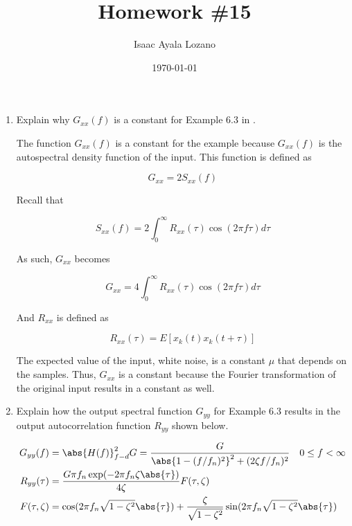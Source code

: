 \documentclass[a4paper,12pt]{article}
\title{Homework \#15}
\author{Isaac Ayala Lozano}
\date{\today}
\begin{document}
\maketitle

\begin{enumerate}
 \item Explain why $G_{xx}(f)$ is a constant for Example 6.3 in \cite{bendat2011random}.

 The function $G_{xx}(f)$ is a constant for the example because $G_{xx}(f)$ is the autospectral density function of the input.
 This function is defined as

 \begin{equation*}
  G_{xx} = 2 S_{xx}(f)
 \end{equation*}

 Recall that

\begin{equation*}
 S_{xx}(f) = 2 \int_0^\infty R_{xx}(\tau) \cos(2 \pi f \tau ) d\tau
\end{equation*}

 As such, $G_{xx}$ becomes

 \begin{equation*}
  G_{xx} = 4 \int_0^\infty R_{xx}(\tau) \cos(2 \pi f \tau ) d\tau
 \end{equation*}


 And $R_{xx}$ is defined as

\begin{equation*}
 R_{xx}(\tau) = E[x_k(t) x_k(t+\tau)]
\end{equation*}

The expected value of the input, white noise, is a constant $\mu$ that depends on the samples. Thus, $G_{xx}$ is a constant because the Fourier transformation of the original input results in a constant as well.

\newpage

\item Explain how the output spectral function $G_{yy}$ for Example 6.3 results in the output autocorrelation function $R_{yy}$ shown below.

\begin{align*}
 G_{yy}(f) &= \abs{H(f)}_{f-d}^2 G = \frac{G}{\abs{1-(f/f_n)^2}^2 + (2 \zeta f/f_n)^2 } \quad 0 \leq f < \infty \\
 R_{yy}(\tau) &= \frac{G \pi f_n \exp(-2\pi f_n \zeta \abs{\tau})}{4 \zeta} F(\tau, \zeta) \\
 F(\tau, \zeta) &=
  \cos(2 \pi f_n \sqrt{1-\zeta^2} \abs{\tau})
 +
 \frac{\zeta}{\sqrt{1-\zeta^2}}
 \sin(2 \pi f_n \sqrt{1-\zeta^2} \abs{\tau})
\end{align*}


\end{enumerate}
\end{document}
